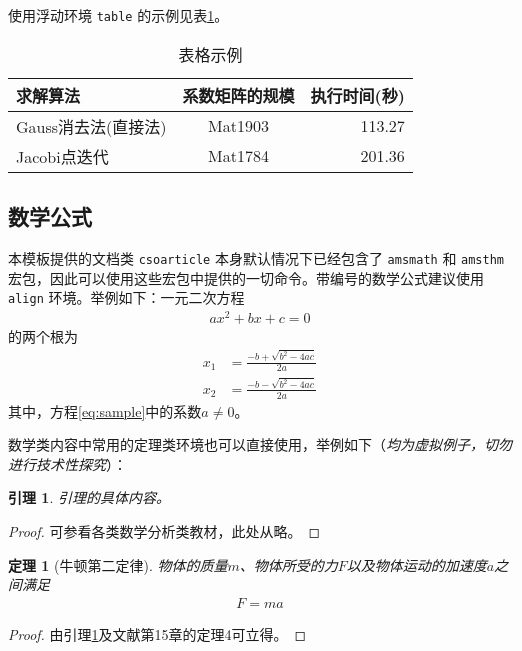 \documentclass[UTF8]{csoarticle}
\newtheorem{theorem}{定理}
\newtheorem{lemma}{引理}
\begin{document}
使用浮动环境 \verb|table| 的示例见表\ref{tab:sample}。
\begin{table}
  \caption{表格示例}
  \label{tab:sample}
  \centering
  \begin{tabular}{lcr}%
    \hline
    求解算法                & 系数矩阵的规模    & 执行时间(秒)  \\
    \hline
    Gauss消去法(直接法)     & Mat1903           &  113.27       \\
    Jacobi点迭代            & Mat1784           &  201.36       \\
    \hline
  \end{tabular}
\end{table}

\subsection{数学公式}

本模板提供的文档类 \verb|csoarticle| 本身默认情况下已经包含了 \verb|amsmath| 和 \verb|amsthm| 宏包，因此可以使用这些宏包中提供的一切命令。带编号的数学公式建议使用 \verb|align| 环境。举例如下：一元二次方程
\begin{align}\label{eq:sample}
    a x^2 + b x + c = 0
\end{align}
的两个根为
\begin{align}\label{eq:root}
    x_1 &= \frac{-b + \sqrt{b^2 - 4ac}}{2a} \\
    x_2 &= \frac{-b - \sqrt{b^2 - 4ac}}{2a}
\end{align}
其中，方程\eqref{eq:sample}中的系数$a \not= 0$。

数学类内容中常用的定理类环境也可以直接使用，举例如下（\emph{均为虚拟例子，切勿进行技术性探究}）：
\begin{lemma}\label{lem:levy}
    引理的具体内容。
\end{lemma}
\begin{proof}
    可参看各类数学分析类教材，此处从略。
\end{proof}

\begin{theorem}[牛顿第二定律]\label{thm:newton}
物体的质量$m$、物体所受的力$F$以及物体运动的加速度$a$之间满足
\begin{align}\label{eq:f-eq-ma}
    F = m a
\end{align}
\end{theorem}
\begin{proof}
由引理\ref{lem:levy}及文献\cite{bib1}第15章的定理4可立得。
\end{proof}
\end{document}
